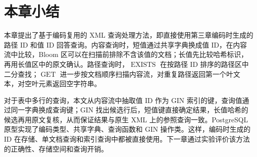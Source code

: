 \section{本章小结}

本章提出了基于编码复用的 XML 查询处理方法，即直接使用第三章编码时生成的路径 ID 和值 ID 回答查询。内容查询时，短值通过共享字典换成值 ID，在内容流中比较，Bloom 区可以在扫描前排除不含该值的文档；长值先比较哈希标识，再用长值区中的原文确认。路径查询时，$\operatorname{EXISTS}$ 在按路径 ID 排序的路径区中二分查找；$\operatorname{GET}$ 进一步按文档顺序扫描内容流，对重复路径返回第一个叶文本，对空叶元素返回空字符串。

对于表中多行的查询，本文从内容流中抽取值 ID 作为 GIN 索引的键，查询值通过同一字典换成查询键；GIN 找出候选行后，短值键直接确定结果，长值哈希的候选再用原文复核，从而保证结果与原生 XML 上的参照查询一致。PostgreSQL 原型实现了编码类型、共享字典、查询函数和 GIN 操作类。这样，编码时生成的 ID 在存储、单文档查询和索引查询中都被直接使用。下一章通过实验评价该方法的正确性、存储空间和查询开销。
